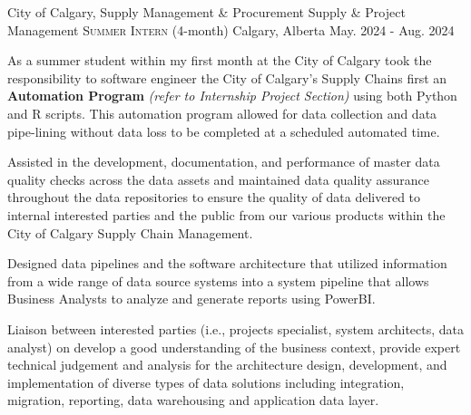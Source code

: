 


\begin{cventries}
  \cventry
    {City of Calgary, Supply Management \& Procurement} %
    {Supply \& Project Management  \textsc{Summer Intern} (4-month)} %
    {Calgary, Alberta } %
    {May. 2024 - Aug. 2024} %
    {
      \begin{cvitems} %
        \item As a summer student within my first month at the City of Calgary took the responsibility to software engineer the City of Calgary's Supply Chains first an \textbf{Automation Program} \textit{(refer to Internship Project Section)} using both Python and R scripts. This automation program allowed for data collection and  data pipe-lining without data loss to be completed at a scheduled automated time.  
        \item Assisted in the development, documentation, and performance of master data quality checks across the data assets and maintained data quality assurance throughout the data repositories to ensure the quality of data delivered to internal interested parties and the public from our various products within the City of Calgary Supply Chain Management.
        \item Designed data pipelines and the software architecture that utilized information from a wide range of data source systems into a system pipeline that allows Business Analysts to analyze and generate reports using PowerBI.
        \item Liaison between interested parties (i.e., projects specialist, system architects, data analyst) on develop a good understanding of the business context, provide expert technical judgement and analysis for the architecture design, development, and implementation of diverse types of data solutions including integration, migration, reporting, data warehousing and application data layer.

\end{cvitems}}
\end{cventries}
